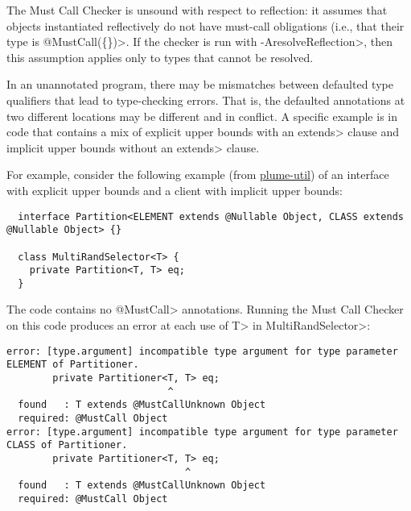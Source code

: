 


The Must Call Checker is unsound with respect to reflection: it assumes
that objects instantiated reflectively do not have must-call obligations (i.e., that their
type is \<@MustCall(\{\})>. If the checker is run with \<-AresolveReflection>, then
this assumption applies only to types that cannot be resolved.


In an unannotated program, there may be mismatches between defaulted type
qualifiers that lead to type-checking errors.  That is, the defaulted
annotations at two different locations may be different and in conflict.  A
specific example is in code that contains a mix of explicit upper bounds
with an \<extends> clause and implicit upper bounds without an \<extends>
clause.

For example, consider the following example (from
\href{https://github.com/plume-lib/plume-util}{plume-util}) of an
interface with explicit upper bounds and a client with implicit upper
bounds:
\begin{Verbatim}
  interface Partition<ELEMENT extends @Nullable Object, CLASS extends @Nullable Object> {}

  class MultiRandSelector<T> {
    private Partition<T, T> eq;
  }
\end{Verbatim}

The code contains no \<@MustCall> annotations.
Running the Must Call Checker on this code produces an error at each use
of \<T> in \<MultiRandSelector>:

\begin{smaller}
\begin{Verbatim}
error: [type.argument] incompatible type argument for type parameter ELEMENT of Partitioner.
        private Partitioner<T, T> eq;
                            ^
  found   : T extends @MustCallUnknown Object
  required: @MustCall Object
error: [type.argument] incompatible type argument for type parameter CLASS of Partitioner.
        private Partitioner<T, T> eq;
                               ^
  found   : T extends @MustCallUnknown Object
  required: @MustCall Object
\end{Verbatim}
\end{smaller}

